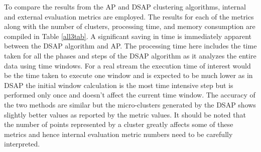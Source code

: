 To compare the results from the AP and DSAP clustering algorithms, internal and external evaluation metrics are employed. The results for each of the metrics along with the number of clusters, processing time, and memory consumption are compiled in Table \ref{all3tab}. A significant saving in time is immediately apparent between the DSAP algorithm and AP. The processing time here includes the time taken for all the phases and steps of the DSAP algorithm as it analyzes the entire data using time windows. For a real stream the execution time of interest would be the time taken to execute one window and is expected to be much lower as in DSAP the initial window calculation is the most time intensive step but is performed only once and doesn't affect the current time window. The accuracy of the two methods are similar but the micro-clusters generated by the DSAP shows slightly better values as reported by the metric values. It should be noted that the number of points represented by a cluster greatly affects some of these metrics and hence internal evaluation metric numbers need to be carefully interpreted.


